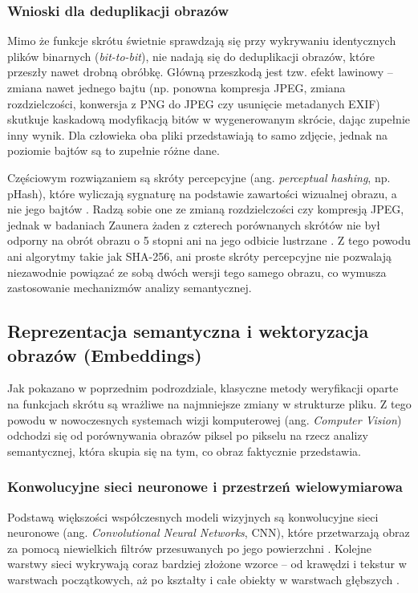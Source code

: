 \subsubsection{Wnioski dla deduplikacji obrazów}


Mimo że funkcje skrótu świetnie sprawdzają się przy wykrywaniu identycznych plików binarnych (\textit{bit-to-bit}), nie nadają się do deduplikacji obrazów, które przeszły nawet drobną obróbkę. Główną przeszkodą jest tzw. efekt lawinowy -- zmiana nawet jednego bajtu (np. ponowna kompresja JPEG, zmiana rozdzielczości, konwersja z PNG do JPEG czy usunięcie metadanych EXIF) skutkuje kaskadową modyfikacją bitów w wygenerowanym skrócie, dając zupełnie inny wynik. Dla człowieka oba pliki przedstawiają to samo zdjęcie, jednak na poziomie bajtów są to zupełnie różne dane.

Częściowym rozwiązaniem są skróty percepcyjne (ang. \textit{perceptual hashing}, np. pHash), które wyliczają sygnaturę na podstawie zawartości wizualnej obrazu, a nie jego bajtów \cite{zauner2010}. Radzą sobie one ze zmianą rozdzielczości czy kompresją JPEG, jednak w badaniach Zaunera żaden z czterech porównanych skrótów nie był odporny na obrót obrazu o 5 stopni ani na jego odbicie lustrzane \cite{zauner2010}. Z tego powodu ani algorytmy takie jak SHA-256, ani proste skróty percepcyjne nie pozwalają niezawodnie powiązać ze sobą dwóch wersji tego samego obrazu, co wymusza zastosowanie mechanizmów analizy semantycznej.


\subsection{Reprezentacja semantyczna i wektoryzacja obrazów (Embeddings)}


Jak pokazano w poprzednim podrozdziale, klasyczne metody weryfikacji oparte na funkcjach skrótu są wrażliwe na najmniejsze zmiany w strukturze pliku. Z tego powodu w nowoczesnych systemach wizji komputerowej (ang. \textit{Computer Vision}) odchodzi się od porównywania obrazów piksel po pikselu na rzecz analizy semantycznej, która skupia się na tym, co obraz faktycznie przedstawia.


\subsubsection{Konwolucyjne sieci neuronowe i przestrzeń wielowymiarowa}


Podstawą większości współczesnych modeli wizyjnych są konwolucyjne sieci neuronowe (ang. \textit{Convolutional Neural Networks}, CNN), które przetwarzają obraz za pomocą niewielkich filtrów przesuwanych po jego powierzchni \cite{goodfellow2016}. Kolejne warstwy sieci wykrywają coraz bardziej złożone wzorce -- od krawędzi i tekstur w warstwach początkowych, aż po kształty i całe obiekty w warstwach głębszych \cite{goodfellow2016}.


